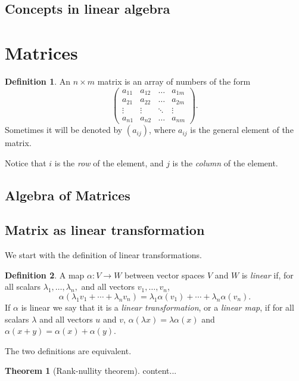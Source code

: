 \documentclass[12pt]{book}
\newcommand{\ra}{\rightarrow}
\theoremstyle{definition}
\newtheorem{definition}{Definition}[section]
\newtheorem{theorem}{Theorem}[chapter]
\theoremstyle{remark}
\begin{document}
			\subsection{Concepts in linear algebra}
		\section{Matrices}
			\begin{definition}
				An $n \times m$ matrix is an array of numbers of the form
				\begin{equation*}
					\begin{pmatrix}
					a_{11} & a_{12} & \ldots & a_{1m} \\
					a_{21} & a_{22} & \ldots & a_{2m} \\
					\vdots & \vdots & \ddots & \vdots \\
					a_{n1} & a_{n2} & \ldots & a_{nm}
					\end{pmatrix}.
				\end{equation*}
				Sometimes it will be denoted by $(a_{ij})$, where $a_{ij}$ is the general element of the matrix.
			\end{definition}
				Notice that $i$ is the \textit{row} of the element, and $j$ is the \textit{column} of the element.
			\subsection{Algebra of Matrices}
			
			\subsection{Matrix as linear transformation}
				We start with the definition of linear transformations.
				\begin{definition}
					A map $\alpha \colon V \ra W$ between vector spaces $V$ and $W$ is \textit{linear} if, for all scalars $\lambda_1, \ldots, \lambda_n,$ and all vectors $v_1, \ldots, v_n$,
					\begin{equation*}
						\alpha\left(\lambda_1v_1 + \cdots + \lambda_n v_n\right) = \lambda_1\alpha(v_1) + \cdots + \lambda_n\alpha(v_n).
					\end{equation*}
				If $\alpha$ is linear we say that it is a \textit{linear transformation}, or a \textit{linear map}, if for all scalars $\lambda$ and all vectors $u$ and $v$, $\alpha(\lambda x) = \lambda\alpha(x)$ and $\alpha( x + y) = \alpha (x) + \alpha(y)$.
				\end{definition}
			The two definitions are equivalent.
				\begin{theorem}[Rank-nullity theorem]
					content...
				\end{theorem}
			
\end{document}
